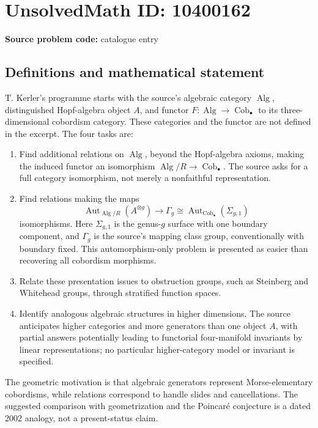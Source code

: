 \documentclass[11pt]{article}
\begin{document}
\section*{UnsolvedMath ID: 10400162}
\textbf{Source problem code:} catalogue entry
\subsection{Definitions and mathematical statement}
T. Kerler's programme starts with the source's algebraic category \(\operatorname{Alg}\), distinguished Hopf-algebra object \(A\), and functor \(F:\operatorname{Alg}\to\operatorname{Cob}_\bullet\) to its three-dimensional cobordism category. These categories and the functor are not defined in the excerpt. The four tasks are:
\begin{enumerate}
\item Find additional relations on \(\operatorname{Alg}\), beyond the Hopf-algebra axioms, making the induced functor an isomorphism \(\operatorname{Alg}/R\to\operatorname{Cob}_\bullet\). The source asks for a full category isomorphism, not merely a nonfaithful representation.
\item Find relations making the maps
\[
 \operatorname{Aut}_{\operatorname{Alg}/R}(A^{\otimes g})
 \longrightarrow\Gamma_g\cong
 \operatorname{Aut}_{\operatorname{Cob}_\bullet}(\Sigma_{g,1})
\]
isomorphisms. Here \(\Sigma_{g,1}\) is the genus-\(g\) surface with one boundary component, and \(\Gamma_g\) is the source's mapping class group, conventionally with boundary fixed. This automorphism-only problem is presented as easier than recovering all cobordism morphisms.
\item Relate these presentation issues to obstruction groups, such as Steinberg and Whitehead groups, through stratified function spaces.
\item Identify analogous algebraic structures in higher dimensions. The source anticipates higher categories and more generators than one object \(A\), with partial answers potentially leading to functorial four-manifold invariants by linear representations; no particular higher-category model or invariant is specified.
\end{enumerate}
The geometric motivation is that algebraic generators represent Morse-elementary cobordisms, while relations correspond to handle slides and cancellations. The suggested comparison with geometrization and the Poincar\'e conjecture is a dated 2002 analogy, not a present-status claim.
\end{document}
